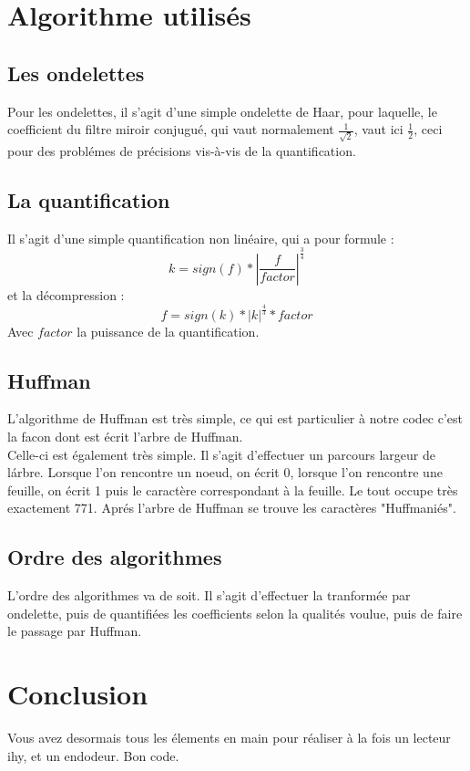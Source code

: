 \documentclass[a4paper,12pt]{article}
\begin{document}
\section{Algorithme utilis\'es}
\subsection{Les ondelettes}
Pour les ondelettes, il s'agit d'une simple ondelette de Haar, pour
laquelle, le coefficient du filtre miroir conjugu\'e, qui vaut
normalement $\frac{1}{\sqrt{2}}$, vaut ici $\frac{1}{2}$, ceci pour des
probl\'emes de pr\'ecisions vis-\`a-vis de la quantification.
\subsection{La quantification}
Il s'agit d'une simple quantification non lin\'eaire, qui a pour formule
:$$ k = sign\left(f\right) *
\left|\frac{f}{factor}\right|^{\frac{3}{4}}$$
et la décompression :
$$ f = sign\left(k\right) * \left|k\right|^{\frac{4}{3}} * factor$$
Avec $factor$ la puissance de la quantification.
\subsection{Huffman}
L'algorithme de Huffman est tr\`es simple, ce qui est particulier \`a
notre codec c'est la facon dont est \'ecrit l'arbre de Huffman.\\
Celle-ci est \'egalement tr\`es simple. Il s'agit d'effectuer un
parcours largeur de l\'arbre. Lorsque l'on rencontre un noeud, on
\'ecrit 0, lorsque l'on rencontre une feuille, on \'ecrit 1 puis le
caract\`ere correspondant \`a la feuille. Le tout occupe tr\`es
exactement 771. Apr\'es l'arbre de Huffman se trouve les caract\`eres
"Huffmani\'es".
\subsection{Ordre des algorithmes}
L'ordre des algorithmes va de soit. Il s'agit d'effectuer la
tranform\'ee par ondelette, puis de quantifi\'ees les coefficients selon
la qualit\'es voulue, puis de faire le passage par Huffman.

\section{Conclusion}
Vous avez desormais tous les \'elements en main pour r\'ealiser \`a la
fois un lecteur ihy, et un endodeur. Bon code.
\end{document}

